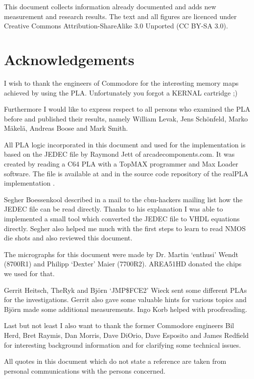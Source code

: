 This document collects information already documented and adds new
measurement and research results. The text and all figures are licenced
under Creative Commons Attribution-ShareAlike 3.0 Unported (CC BY-SA 3.0).


\section{Acknowledgements}

I wish to thank the engineers of Commodore for the interesting memory maps
achieved by using the PLA. Unfortunately you forgot a KERNAL cartridge ;)

Furthermore I would like to express respect to all persons who examined the
PLA before and published their results, namely William Levak, Jens
Schönfeld, Marko Mäkelä, Andreas Boose and Mark Smith.

All PLA logic incorporated in this document and used for the implementation is
based on the JEDEC file by Raymond Jett of arcadecomponents.com. It was
created by reading a C64 PLA with a TopMAX programmer and Max Loader
software. The file is available at \cite{AC12} and in the source code
repository of the realPLA implementation \cite{realPLA12}.

Segher Boessenkool described in a mail to the cbm-hackers mailing list
\cite{Boess12} how the JEDEC file can be read directly. Thanks to his
explanation I was able to implemented a small tool which converted the JEDEC
file to VHDL equations directly. Segher also helped me much with the
first steps to learn to read NMOS die shots and also reviewed this document.

The micrographs for this document were made by Dr. Martin `enthusi' Wendt
(8700R1) and Philipp `Dexter' Maier (7700R2). AREA51HD donated the chips we
used for that.

Gerrit Heitsch, TheRyk and Björn `JMP\$FCE2' Wieck sent some different PLAs
for the investigations. Gerrit also gave some valuable hints for various topics
and Björn made some additional measurements. Ingo Korb helped with proofreading.

Last but not least I also want to thank the former Commodore engineers
Bil Herd, Bret Raymis, Dan Morris, Dave DiOrio, Dave Esposito and James
Redfield for interesting background information and for clarifying some
technical issues.

All quotes in this document which do not state a reference are taken from
personal communications with the persons concerned.

